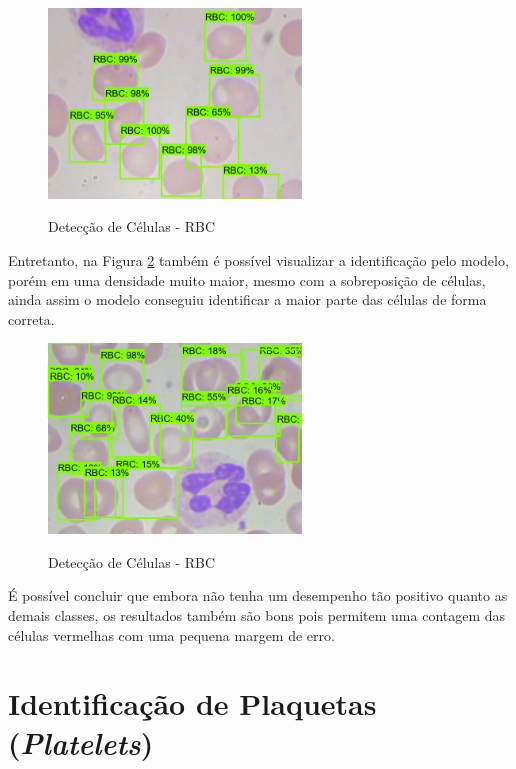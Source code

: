 \begin{figure}[!htb]
	\centering
	\caption{Detecção de Células - RBC}
	\includegraphics[width=0.60\textwidth]{img/predict_rbc.jpeg}
	\label{fig:predict_rbc}
\end{figure}

Entretanto, na Figura \ref{fig:predict_rbc_2} também é possível visualizar a identificação pelo modelo, porém em uma densidade muito maior, mesmo com a sobreposição de células, ainda assim o modelo conseguiu identificar a maior parte das células de forma correta.

\begin{figure}[!htb]
	\centering
	\caption{Detecção de Células - RBC}
	\includegraphics[width=0.60\textwidth]{img/predict_rbc_2.jpeg}
	\label{fig:predict_rbc_2}
\end{figure}

É possível concluir que embora não tenha um desempenho tão positivo quanto as demais classes, os resultados também são bons pois permitem uma contagem das células vermelhas com uma pequena margem de erro.

\section{Identificação de Plaquetas (\emph{Platelets})}

